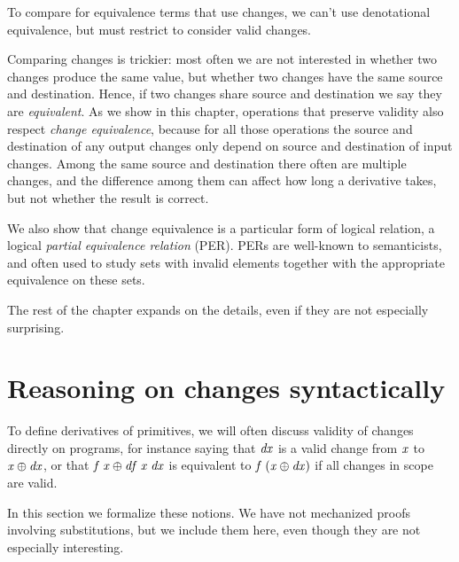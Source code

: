 To compare for equivalence terms that use changes, we can't use
denotational equivalence, but must restrict to consider valid
changes.

Comparing changes is trickier: most often we are not interested
in whether two changes produce the same value, but whether two
changes have the same source and destination. Hence, if two
changes share source and destination we say they are \emph{equivalent}.
As we show in this chapter, operations that preserve validity also respect
\emph{change equivalence}, because for all those operations the source
and destination of any output changes only depend on source and
destination of input changes.
Among the same source and destination there often are multiple
changes, and the difference among them can affect how long a
derivative takes, but not whether the result is correct.

We also show that change equivalence is a particular form of
logical relation, a logical \emph{partial equivalence relation}
(PER). PERs are well-known to semanticists, and often used to
study sets with invalid elements together with the appropriate
equivalence on these sets.

The rest of the chapter expands on the details, even if they are
not especially surprising.

\section{Reasoning on changes syntactically}
\label{sec:denot-syntactic-reasoning}
To define derivatives of primitives, we will often discuss
validity of changes directly on programs, for instance saying
that \ensuremath{\Varid{dx}} is a valid change from \ensuremath{\Varid{x}} to \ensuremath{\Varid{x}\oplus \Varid{dx}}, or that
\ensuremath{\Varid{f}\;\Varid{x}\oplus \Varid{df}\;\Varid{x}\;\Varid{dx}} is equivalent to \ensuremath{\Varid{f}\;(\Varid{x}\oplus \Varid{dx})} if all
changes in scope are valid.

In this section we formalize these notions. We have not
mechanized proofs involving substitutions, but we include them
here, even though they are not especially interesting.

